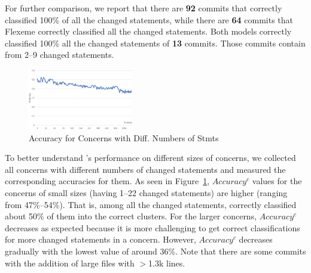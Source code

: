  For further comparison, we report
that there are {\bf 92} commits that {\tool} correctly classified
100\% of all the changed statements, while there are {\bf 64} commits
that Flexeme correctly classified all the
changed statements. Both models correctly classified 100\% all the
changed statements of {\bf 13} commits.  Those commits contain from
2--9 changed statements.
       



\begin{figure}[t]
	\centering \includegraphics[width=1.8in]{figures/accuracy-concerns.png}
	\vspace{-6pt}
	\caption{Accuracy for Concerns with Diff. Numbers of Stmts}
	\label{acc-concerns}
\end{figure}

To better understand {\tool}'s performance on different sizes of
concerns, we collected all concerns with different numbers of changed
statements and measured the corresponding accuracies for them.  As
seen in Figure~\ref{acc-concerns}, $Accuracy^{c}$ values for the concerns of
small sizes (having 1--22 changed statements) are higher (ranging
from 47\%--54\%). That is, among all the changed statements, {\tool}
correctly classified about 50\% of them into the correct clusters.
For the larger concerns, $Accuracy^{c}$ decreases as expected because
it is more challenging to get correct classifications for more changed
statements in a concern. However, $Accuracy^{c}$ decreases gradually with the
lowest value of around 36\%. Note that there are some commits with the
addition of large files with $>$1.3k lines.

